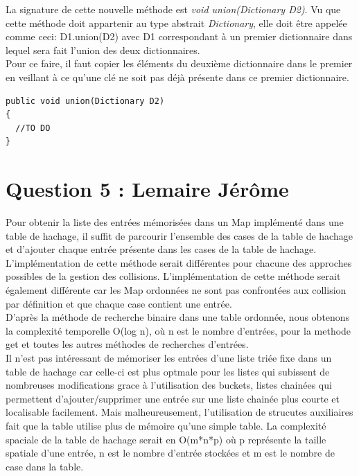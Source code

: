 \documentclass[10pt,a4paper]{article}
\begin{document}
La signature de cette nouvelle méthode est \emph{void union(Dictionary D2)}. Vu que cette méthode doit appartenir au type abstrait \emph{Dictionary}, elle doit être appelée comme ceci: D1.union(D2) avec D1 correspondant à un premier dictionnaire dans lequel sera fait l'union des deux dictionnaires. \\
\newline
Pour ce faire, il faut copier les éléments du deuxième dictionnaire dans le premier en veillant à ce qu'une clé ne soit pas déjà présente dans ce premier dictionnaire.

\begin{lstlisting}
public void union(Dictionary D2)
{
  //TO DO
}
\end{lstlisting}

\section*{Question 5 : Lemaire Jérôme}


Pour obtenir la liste des entrées mémorisées dans un Map implémenté dans une table de hachage, il suffit de parcourir l'ensemble des cases de la table de hachage et d'ajouter chaque entrée présente dans les cases de la table de hachage. L'implémentation de cette méthode serait différentes pour chacune des approches possibles de la gestion des collisions. L'implémentation de cette méthode serait également différente car les Map ordonnées ne sont pas confrontées aux collision par définition et que chaque case contient une entrée.\\
D'après la méthode de recherche binaire dans une table ordonnée, nous obtenons la complexité temporelle O(log n), où n est le nombre d'entrées, pour la methode get et toutes les autres méthodes de recherches d'entrées.\\

Il n'est pas intéressant de mémoriser les entrées d'une liste triée fixe dans un table de hachage car celle-ci est plus optmale pour les listes qui subissent de nombreuses modifications grace à l'utilisation des buckets, listes chainées qui permettent d'ajouter/supprimer une entrée sur une liste chainée plus courte et localisable facilement. Mais malheureusement, l'utilisation de strucutes auxiliaires fait que la table utilise plus de mémoire qu'une simple table. La complexité spaciale de la table de hachage serait en O(m*n*p) où p représente la taille spatiale d'une entrée, n est le nombre d'entrée stockées et m est le nombre de case dans la table. 
 
\end{document}
